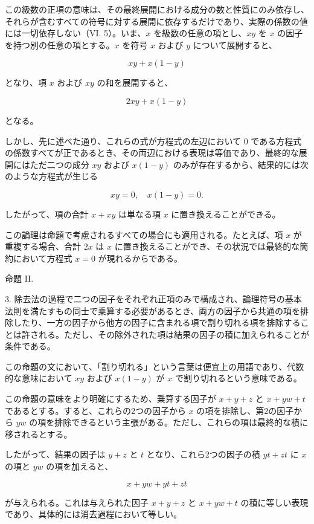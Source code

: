 \documentclass[a4paper,11pt,openany]{ltjsbook}
\begin{document}
この級数の正項の意味は、その最終展開における成分の数と性質にのみ依存し、それらが含むすべての符号に対する展開に依存するだけであり、実際の係数の値には一切依存しない（VI. 5）。いま、$x$ を級数の任意の項とし、$xy$ を $x$ の因子を持つ別の任意の項とする。$x$ を符号 $x$ および $y$ について展開すると、

\[
xy + x(1 - y)
\]

となり、項 $x$ および $xy$ の和を展開すると、

\[
2xy + x(1 - y)
\]

となる。

しかし、先に述べた通り、これらの式が方程式の左辺において 0 である方程式の係数すべてが正であるとき、その両辺における表現は等価であり、最終的な展開にはただ二つの成分 $xy$ および $x(1 - y)$ のみが存在するから、結果的には次のような方程式が生じる

\[
xy = 0, \quad x(1 - y) = 0.
\]

したがって、項の合計 $x + xy$ は単なる項 $x$ に置き換えることができる。

この論理は命題で考慮されるすべての場合にも適用される。たとえば、項 $x$ が重複する場合、合計 $2x$ は $x$ に置き換えることができ、その状況では最終的な簡約において方程式 $x = 0$ が現れるからである。

\begin{center}
\textsc{命題 II.}
\end{center}

3. 除去法の過程で二つの因子をそれぞれ正項のみで構成され、論理符号の基本法則を満たすもの同士で乗算する必要があるとき、両方の因子から共通の項を排除したり、一方の因子から他方の因子に含まれる項で割り切れる項を排除することは許される。ただし、その除外された項は結果の因子の積に加えられることが条件である。

この命題の文において、「割り切れる」という言葉は便宜上の用語であり、代数的な意味において $xy$ および $x(1 - y)$ が $x$ で割り切れるという意味である。

この命題の意味をより明確にするため、乗算する因子が \( x + y + z \) と \( x + yw + t \) であるとする。すると、これらの2つの因子から \( x \) の項を排除し、第2の因子から \( yw \) の項を排除できるという主張がある。ただし、これらの項は最終的な積に移されるとする。

したがって、結果の因子は \( y + z \) と \( t \) となり、これら2つの因子の積 \( yt + zt \) に \( x \) の項と \( yw \) の項を加えると、

\[
x + yw + yt + zt
\]

が与えられる。これは与えられた因子 \( x + y + z \) と \( x + yw + t \) の積に等しい表現であり、具体的には消去過程において等しい。
\end{document}
